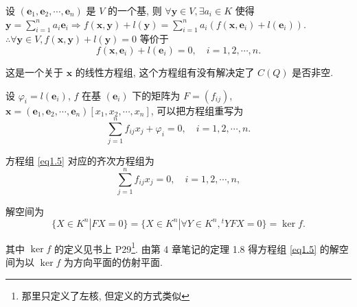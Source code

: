 \documentclass[color=black,device=normal,lang=cn,mode=geye]{elegantnote}
\begin{document}
设 $(\boldsymbol{e}_1,\boldsymbol{e}_2,\cdots,\boldsymbol{e}_n)$ 是 $V$ 的一个基, 则 $\forall\boldsymbol{y}\in V,\exists a_i\in K$ 使得 $\boldsymbol{y}=\sum\limits_{i=1}^na_i\boldsymbol{e}_i\Rightarrow f(\boldsymbol{x},\boldsymbol{y})+l(\boldsymbol{y})=\sum\limits_{i=1}^na_i(f(\boldsymbol{x},\boldsymbol{e}_i)+l(\boldsymbol{e}_i))$. $\therefore\forall\boldsymbol{y}\in V,f(\boldsymbol{x},\boldsymbol{y})+l(\boldsymbol{y})=0$ 等价于
\[f(\boldsymbol{x},\boldsymbol{e}_i)+l(\boldsymbol{e}_i)=0,\quad i=1,2,\cdots,n.\]

这是一个关于 $\boldsymbol{x}$ 的线性方程组, 这个方程组有没有解决定了 $C(Q)$ 是否非空.

设 $\varphi_i=l(\boldsymbol{e}_i)$, $f$ 在基 $(\boldsymbol{e}_i)$ 下的矩阵为 $F=(f_{ij})$, $\boldsymbol{x}=(\boldsymbol{e}_1,\boldsymbol{e}_2,\cdots,\boldsymbol{e}_n)[x_1,x_2,\cdots,x_n]$, 可以把方程组重写为
\begin{equation}\label{eq1.5}
    \sum\limits_{j=1}^nf_{ij}x_j+\varphi_i=0,\quad i=1,2,\cdots,n.
\end{equation}

方程组 \ref{eq1.5} 对应的齐次方程组为
\[\sum\limits_{j=1}^nf_{ij}x_j=0,\quad i=1,2,\cdots,n,\]

解空间为
\[\{X\in K^n|FX=0\}=\{X\in K^n|\forall Y\in K^n,{}^tYFX=0\}=\ker f.\]

其中 $\ker f$ 的定义见书上 P29\footnote{那里只定义了左核, 但定义的方式类似}. 由第 4 章笔记的定理 1.8 得方程组 \ref{eq1.5} 的解空间为以 $\ker f$ 为方向平面的仿射平面.
\end{document}
